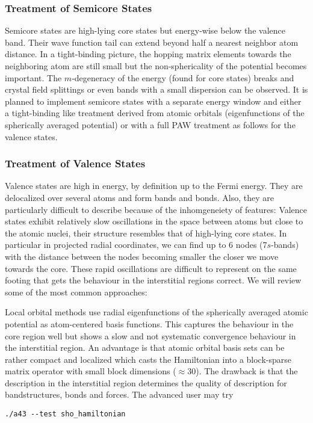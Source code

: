 \documentclass[oribibl]{llncs}
\begin{document}
\subsubsection{Treatment of Semicore States} \label{sec:semincore-states}
%
Semicore states are high-lying core states but energy-wise below the valence band.
Their wave function tail can extend beyond half a nearest neighbor atom distance.
In a tight-binding picture, the hopping matrix elements towards the neighboring atom are still small
but the non-sphericality of the potential becomes important.
The $m$-degeneracy of the energy (found for core states) breaks 
and crystal field splittings or even bands with a small dispersion can be observed.
It is planned to implement semicore states with a separate energy window
and either a tight-binding like treatment derived from atomic orbitals 
(eigenfunctions of the spherically averaged potential) 
or with a full \ac{PAW} treatment as follows for the valence states.

%
%
\subsubsection{Treatment of Valence States} \label{sec:valence-states}
%
Valence states are high in energy, by definition up to the Fermi energy.
They are delocalized over several atoms and form bands and bonds.
Also, they are particularly difficult to describe because of the 
inhomgeneiety of features:
Valence states exhibit relatively slow oscillations 
in the space between atoms but close to the atomic nuclei,
their structure resembles that of high-lying core states.
In particular in projected radial coordinates, we can find up to $6$ nodes
(7$s$-bands) with the distance between the nodes becoming smaller
the closer we move towards the core.
These rapid oscillations are difficult to represent
on the same footing that gets the behaviour in the interstitial regions correct. 
We will review some of the most common approaches:


Local orbital methods use radial eigenfunctions 
of the spherically averaged atomic potential as atom-centered basis functions.
This captures the behaviour in the core region well
but shows a slow and not systematic convergence behaviour in the interstitial region. 
An advantage is that atomic orbital basis sets can be rather compact
and localized which casts the Hamiltonian into a block-sparse matrix operator with small block dimensions ($\approx 30$).
The drawback is that the description in the interstitial region determines the
quality of description for bandstructures, bonds and forces. The advanced user may try
\begin{verbatim}
./a43 --test sho_hamiltonian
\end{verbatim}
\end{document}
